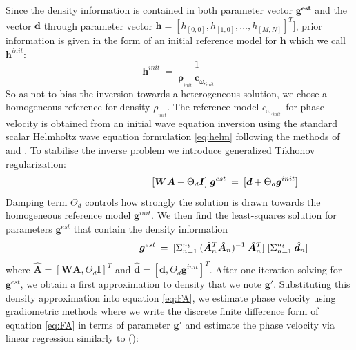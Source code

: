 \documentclass[]{article}
\begin{document}
	Since the density information is contained in both parameter vector $\mathbf{g^{est}}$ and the vector $\mathbf{d}$ through parameter vector $\mathbf{h}= [h_{[0,0]}, h_{[1,0]},..., h_{[M,N]}]^{T}]$, prior information is given in the form of an initial reference model for $\mathbf{h}$ which we call  $\mathbf{h}^{init}$:
	\begin{equation}
		\mathbf{h}^{init} \: = \: \frac{1}{\bm{\rho}_{ _{init}} \: \bm{c}_{\omega,_{ init}} }
	\end{equation}
	So as not to bias the inversion towards a heterogeneous solution, we chose a homogeneous reference for density $\rho_{ _{init}}$. The reference model  $c_{\omega,_{ init}}$ for phase velocity is obtained from an initial wave equation inversion using the standard scalar Helmholtz wave equation formulation \eqref{eq:helm} following the methods of \textcite{de2015near} and \textcite{cao2020near}. 
	To stabilise the inverse problem we introduce generalized Tikhonov regularization:
	\begin{align}
	\shoveright \shoveright \shoveright \shoveright  \shoveright \shoveright \shoveright \shoveright \shoveright \shoveright
	\: \:	[\bm{W} \bm{A} + \Theta_{d} \bm{I}] \; \bm{g}^{est} &\: = \: [\bm{d} + \Theta_{d} \bm{g}^{init}]
	\end{align}
	Damping term $\Theta_{d}$ controls how strongly the solution is drawn towards the homogeneous reference model $\bm{g}^{init}$. We then find the least-squares solution for parameters $\bm{g}^{est}$ that contain the density information
	\begin{align} \label{eq:regul}
		\shoveright \shoveright \shoveright \shoveright  \shoveright \shoveright \shoveright \shoveright \shoveright \shoveright
		\: \:	\bm{g}^{est} &\: = \: [ \Sigma_{n=1}^{n_{t}} \: (\hat{\bm{A}}_{n}^{T}\hat{\bm{A}}_{n})^{-1} \: \hat{\bm{A}}_{n}^{T} ] \; [ \Sigma_{n=1}^{n_{t}} \: \hat{\bm{d}}_{n}] \:
	\end{align}
	where $\hat{\bm{A}} = [\bm{W}\bm{A}, \Theta_{d} \bm{I}]^{T}$ and $\hat{\bm{d}} = [\bm{d}, \Theta_{d} \bm{g}^{init}]^{T}$.
	After one iteration solving for $\bm{g}^{est}$, we obtain a first approximation to density that we note $\bm{g}'$. Substituting this density approximation into equation \eqref{eq:FA}, we estimate phase velocity using gradiometric methods where we write the discrete finite difference form of equation \eqref{eq:FA} in terms of parameter $\bm{g}'$ and estimate the phase velocity via linear regression similarly to (\cite{de2015near}):
\end{document}
